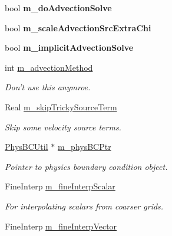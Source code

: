 \begin{DoxyCompactItemize}
\item 
\hypertarget{class_a_m_r_level_mushy_layer_a117454cc35453023858217acf6771c54}{bool {\bfseries m\-\_\-do\-Advection\-Solve}}\label{class_a_m_r_level_mushy_layer_a117454cc35453023858217acf6771c54}

\item 
\hypertarget{class_a_m_r_level_mushy_layer_afbc664002e09b45bb20f5c652aa53a8d}{bool {\bfseries m\-\_\-scale\-Advection\-Src\-Extra\-Chi}}\label{class_a_m_r_level_mushy_layer_afbc664002e09b45bb20f5c652aa53a8d}

\item 
\hypertarget{class_a_m_r_level_mushy_layer_a093fc921a278a2a8bc25040df657a93d}{bool {\bfseries m\-\_\-implicit\-Advection\-Solve}}\label{class_a_m_r_level_mushy_layer_a093fc921a278a2a8bc25040df657a93d}

\item 
int \hyperlink{class_a_m_r_level_mushy_layer_a5304e0c78e438aea19acb6f3702e5243}{m\-\_\-advection\-Method}
\begin{DoxyCompactList}\small\item\em Don't use this anymroe. \end{DoxyCompactList}\item 
Real \hyperlink{class_a_m_r_level_mushy_layer_abe5e093bac71759f0e5b37c64d91b6cc}{m\-\_\-skip\-Tricky\-Source\-Term}
\begin{DoxyCompactList}\small\item\em Skip some velocity source terms. \end{DoxyCompactList}\item 
\hypertarget{class_a_m_r_level_mushy_layer_a556d09747dccd10f54abbf691c058bb5}{\hyperlink{class_phys_b_c_util}{Phys\-B\-C\-Util} $\ast$ \hyperlink{class_a_m_r_level_mushy_layer_a556d09747dccd10f54abbf691c058bb5}{m\-\_\-phys\-B\-C\-Ptr}}\label{class_a_m_r_level_mushy_layer_a556d09747dccd10f54abbf691c058bb5}

\begin{DoxyCompactList}\small\item\em Pointer to physics boundary condition object. \end{DoxyCompactList}\item 
\hypertarget{class_a_m_r_level_mushy_layer_a44fb7624096c8143df1c09e062d57fbf}{Fine\-Interp \hyperlink{class_a_m_r_level_mushy_layer_a44fb7624096c8143df1c09e062d57fbf}{m\-\_\-fine\-Interp\-Scalar}}\label{class_a_m_r_level_mushy_layer_a44fb7624096c8143df1c09e062d57fbf}

\begin{DoxyCompactList}\small\item\em For interpolating scalars from coarser grids. \end{DoxyCompactList}\item 
\hypertarget{class_a_m_r_level_mushy_layer_a9d616c357ecbe1098998feae5ffefa18}{Fine\-Interp \hyperlink{class_a_m_r_level_mushy_layer_a9d616c357ecbe1098998feae5ffefa18}{m\-\_\-fine\-Interp\-Vector}}\label{class_a_m_r_level_mushy_layer_a9d616c357ecbe1098998feae5ffefa18}


\end{DoxyCompactItemize}
